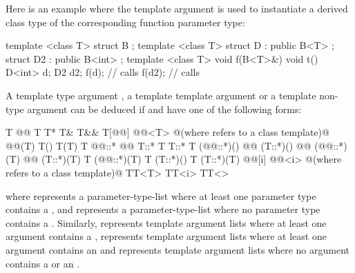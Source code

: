 \begin{example}
Here is an example where the template argument is used to instantiate
a derived class type of the corresponding function parameter type:

\begin{codeblock}
template <class T> struct B { };
template <class T> struct D : public B<T> {};
struct D2 : public B<int> {};
template <class T> void f(B<T>&){}
void t() {
  D<int> d;
  D2     d2;
  f(d);             // calls 
  f(d2);            // calls 
}
\end{codeblock}
\end{example}

\pnum
A template type argument
,
a template template argument
or a template non-type argument
can be deduced if
and
have one of the following forms:
\begin{codeblock}
T
@\cv{}@ T
T*
T&
T&&
T[@@]
@@<T>  @\textrm{(where  refers to a class template)}@
@@(T)
T()
T(T)
T @@::*
@@ T::*
T T::*
T (@@::*)()
@@ (T::*)()
@@ (@@::*)(T)
@@ (T::*)(T)
T (@@::*)(T)
T (T::*)()
T (T::*)(T)
@@[i]
@@<i>  @\textrm{(where  refers to a class template)}@
TT<T>
TT<i>
TT<>
\end{codeblock}
where
represents
a parameter-type-list
where at least one parameter type contains a
,
and
\tcode{()}
represents
a parameter-type-list
where no parameter type contains a
.
Similarly,
represents template argument lists where at least one argument contains a
,
represents template argument lists where at least one argument contains an
and
\tcode{<>}
represents template argument lists where no argument contains a
or an
.

